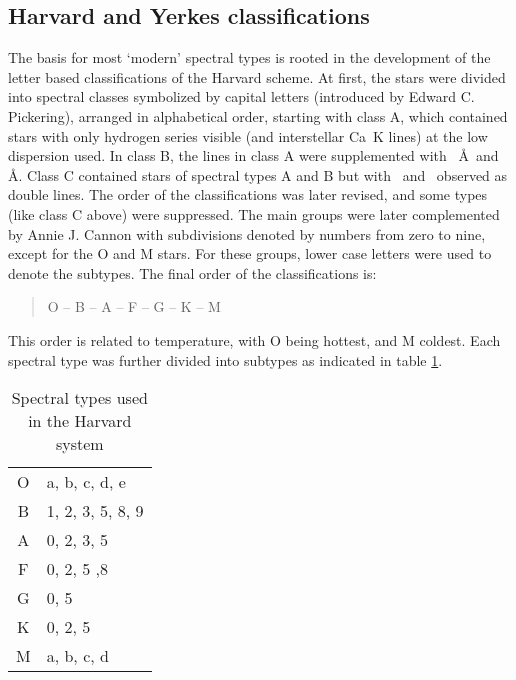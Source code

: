 \subsection{Harvard and Yerkes classifications}
The basis for most `modern' spectral types is rooted in the development
of the letter based classifications of the Harvard scheme. At first,
the stars were divided into spectral classes symbolized by capital
letters (introduced by Edward C. Pickering), arranged in alphabetical
order, starting with class A, which contained stars with only hydrogen
series visible (and interstellar Ca~K lines) at the low dispersion
used. In class B, the lines in class A were supplemented with
\hei~\AA\ and \AA. Class C contained stars of spectral
types A and B but with \hd\ and \hg\ observed as double lines. The order
of the classifications was later revised, and some types (like class
C above) were suppressed. The main groups were later complemented by
Annie J. Cannon with subdivisions denoted by numbers from zero to
nine, except for the O and M stars. For these groups, lower case
letters were used to denote the subtypes.
The final order of the classifications is:
\begin{quote}
O -- B -- A -- F -- G -- K -- M
\end{quote}
This order is related to temperature, with O being hottest, and M
coldest. Each spectral type was further divided into subtypes as
indicated in table \ref{ta:intro:spectypes}.

\begin{table} %
\begin{center}
\caption{Spectral types used in the Harvard system}
\vspace{\abovecaptionskip}
\label{ta:intro:spectypes}
\begin{tabular}{cp{5cm}}
\hline\hline
O & a, b, c, d, e \\
B & 1, 2, 3, 5, 8, 9 \\
A & 0, 2, 3, 5 \\
F & 0, 2, 5 ,8 \\
G & 0, 5 \\
K & 0, 2, 5 \\
M & a, b, c, d \\
\hline\hline
\end{tabular}
\end{center}

\end{table} %

